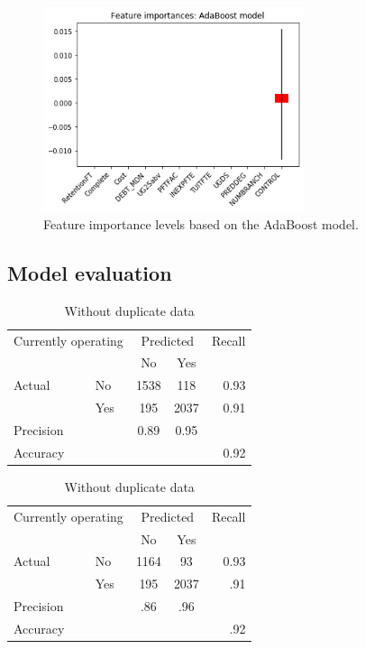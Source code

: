 \documentclass[11pt, letterpaper]{article}
\begin{document}
\begin{figure}[h]
\begin{center}
\includegraphics[width=3in]{ABFeatureImportance.png}
\caption{Feature importance levels based on the AdaBoost model.} 
\label{fig:Features}
\end{center}
\end{figure}

\newpage
\subsection{Model evaluation}

\begin{table}[h!]
 	\caption{AdaBoost model - Confusion matrices and Evaluation metrics} 
 	\begin{minipage}{.5\linewidth}
		\caption{Resampled data}
		\centering
		\begin{tabular}{l l | c c r }
\multicolumn{2}{l}{Currently operating} & \multicolumn{2}{c}{Predicted} & Recall \\
& & No & Yes &  \\ 
\cline{2-5}
Actual & No & 1538 & 118 & 0.93 \\
& Yes & 195 & 2037 & 0.91 \\  \hline
Precision&  & 0.89 & 0.95 \\ 
Accuracy & & &  & 0.92 \\
	\end{tabular}
	\label{tab:ABConfusionResamp}
	\end{minipage}%
	\begin{minipage}{.5\linewidth}
	\caption{Without duplicate data}
	\centering
		\begin{tabular}{l l | c c r }
\multicolumn{2}{l}{Currently operating} & \multicolumn{2}{c}{Predicted} & Recall \\
& & No & Yes &  \\ 
\cline{2-5}
Actual & No & 1164 &  93 & 0.93 \\
& Yes & 195 & 2037 & .91 \\  \hline
Precision&  & .86 & .96 \\ 
Accuracy & & &  & .92 \\
	\end{tabular}
	\label{tab:ABConfusionNoDup}	
	\end{minipage}
\end{table} 
\end{document}
